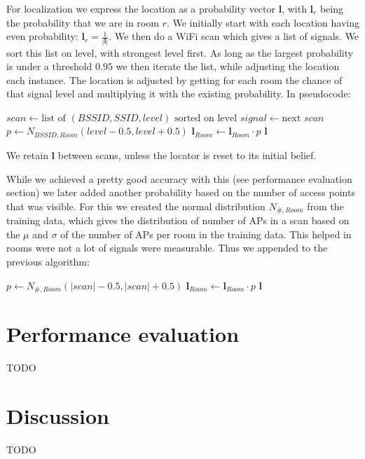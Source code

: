\documentclass[a4paper,10pt,twoside]{IEEEtran}
\begin{document}
For localization we express the location as a probability vector $\mathbf{l}$, with $\mathbf{l}_{r}$ being the probability that we are in room $r$. 
We initially start with each location having even probability: $\mathbf{l}_r = \frac{1}{|\mathbf{l}|}$.
We then do a WiFi scan which gives a list of signals.
We sort this list on level, with strongest level first.
As long as the largest probability is under a threshold $0.95$ we then iterate the list, while adjusting the location each instance.
The location is adjusted by getting for each room the chance of that signal level and multiplying it with the existing probability.
In pseudocode:
\begin{algorithmic}
	\State $scan \gets \text{list of } (BSSID, SSID, level) \text{ sorted on level}$
		\State $signal \gets \text{next } scan$
			\State $p \gets N_{BSSID,Room}(level-0.5,level+0.5)$
			\State $\mathbf{l}_{Room} \gets \mathbf{l}_{Room} \cdot p $
		\EndFor
		\State {} $\mathbf{l}$
	\EndWhile
\end{algorithmic}

We retain $\mathbf{l}$ between scans, unless the locator is reset to its initial belief.

While we achieved a pretty good accuracy with this (see performance evaluation section) we later added another probability based on the number of access points that was visible.
For this we created the normal distribution $N_{\#,Room}$ from the training data, which gives the distribution of number of APs in a scan based on the $\mu$ and $\sigma$ of the number of APs per room in the training data.
This helped in rooms were not a lot of signals were measurable. Thus we appended to the previous algorithm:
\begin{algorithmic}
			\State $p \gets N_{\#,Room}(|scan|-0.5,|scan|+0.5)$
			\State $\mathbf{l}_{Room} \gets \mathbf{l}_{Room} \cdot p $
		\EndFor
		\State {} $\mathbf{l}$
	\EndIf
\end{algorithmic}


\section{Performance evaluation}
\label{sec:evaluation}

TODO

\section{Discussion}
\label{sec:discussion}

TODO



\newpage




\newpage
\appendix
\end{document}
